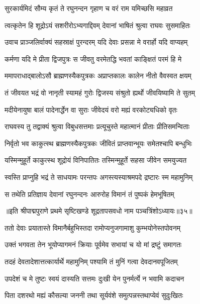 \twolineshloka
{सुरकार्यमिदं सौम्य कृतं ते रघुनन्दन}
{गृहाण च वरं राम यमिच्छसि महाव्रत}%

\twolineshloka
{त्वत्कृतेन हि शूद्रोऽयं सशरीरोऽभ्यगाद्दिवम्}
{देवानां भाषितं श्रुत्वा राघवः सुसमाहितः}%

\twolineshloka
{उवाच प्राञ्जलिर्वाक्यं सहस्राक्षं पुरन्दरम्}
{यदि देवाः प्रसन्ना मे वरार्हो यदि वाप्यहम्}%

\twolineshloka
{कर्मणा यदि मे प्रीता द्विजपुत्रः स जीवतु}
{वरमेतद्धि भवतां काङ्क्षितं परमं हि मे}%

\twolineshloka
{ममापराधाद्बालोऽसौ ब्राह्मणस्यैकपुत्रकः}
{अप्राप्तकालः कालेन नीतो वैवस्वत क्षयम्}%

\twolineshloka
{तं जीवयत भद्रं वो नानृती स्यामहं गुरोः}
{द्विजस्य संश्रुतो ह्यर्थो जीवयिष्यामि ते सुतम्}%

\twolineshloka
{मदीयेनायुषा बालं पादेनार्द्धेन वा सुराः}
{जीवेदयं वरो मह्यं वरकोट्यधिको वृतः}%

\twolineshloka
{राघवस्य तु तद्वाक्यं श्रुत्वा विबुधसत्तमाः}
{प्रत्यूचुस्ते महात्मानं प्रीताः प्रीतिसमन्विताः}%

\twolineshloka
{निर्वृतो भव काकुत्स्थ ब्राह्मणस्यैकपुत्रकः}
{जीवितं प्राप्तवान्भूयः समेतश्चापि बन्धुभिः}%

\twolineshloka
{यस्मिन्मुहूर्ते काकुत्स्थ शूद्रोयं विनिपातितः}
{तस्मिन्मुहूर्ते सहसा जीवेन समयुज्यत}%

\twolineshloka
{स्वस्ति प्राप्नुहि भद्रं ते साधयामः परन्तपः}
{अगस्त्यस्याश्रमपदे द्रष्टारः स्म महामुनिम्}%

\twolineshloka
{स तथेति प्रतिज्ञाय देवानां रघुनन्दनः}
{आरुरोह विमानं तं पुष्पकं हेमभूषितम्}%

{॥इति श्रीपाद्मपुराणे प्रथमे सृष्टिखण्डे शूद्रतापसवधो नाम पञ्चत्रिंशोऽध्यायः॥३५॥}



\twolineshloka
{ततो देवाः प्रयातास्ते विमानैर्बहुभिस्तदा}
{रामोप्यनुजगामाशु कुम्भयोनेस्तपोवनम्}%

\twolineshloka
{उक्तं भगवता तेन भूयोप्यागमनं क्रियाः}
{पूर्वमेव सभायां च यो मां द्रष्टुं समागतः}%

\twolineshloka
{तदहं देवतादेशात्तत्कार्यार्थे महामुनिम्}
{पश्यामि तं मुनिं गत्वा देवदानवपूजितम्}%

\twolineshloka
{उपदेशं च मे तुष्टः स्वयं दास्यति सत्तमः}
{दुःखी येन पुनर्मर्त्ये न भवामि कदाचन}%

\twolineshloka
{पिता दशरथो मह्यं कौसल्या जननी तथा}
{सूर्यवंशे समुत्पन्नस्तथाप्येवं सुदुःखितः}%

